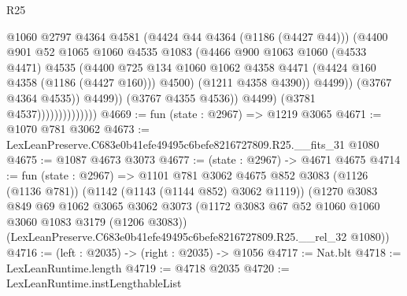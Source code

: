 \begin{lexlean}{R25}
\begin{coremodule}
                                          @1060
                                          @2797
                                          @4364
                                          @4581
                                          (@4424 @44 @4364 (@1186 (@4427 @44)))
                                          (@4400
                                            @901
                                            @52
                                            @1065
                                            @1060
                                            @4535
                                            @1083
                                            (@4466
                                              @900
                                              @1063
                                              @1060
                                              (@4533 @4471)
                                              @4535
                                              (@4400
                                                @725
                                                @134
                                                @1060
                                                @1062
                                                @4358
                                                @4471
                                                (@4424 @160 @4358 (@1186 (@4427 @160)))
                                                @4500)
                                              (@1211 @4358 @4390))
                                            @4499))
                                        (@3767 @4364 @4535))
                                      @4499))
                                  (@3767 @4355 @4536))
                                @4499)
                              (@3781 @4537))))))))))))))
@4669 := fun (state : @2967) => @1219 @3065
@4671 := @1070 @781 @3062
@4673 := LexLeanPreserve.C683e0b41efe49495c6befe8216727809.R25.__fits_31 @1080
@4675 := @1087 @4673 @3073
@4677 := (state : @2967) -> @4671 @4675
@4714 := fun (state : @2967) =>
  @1101
    @781
    @3062
    @4675
    @852
    @3083
    (@1126 (@1136 @781))
    (@1142 (@1143 (@1144 @852) @3062 @1119))
    (@1270
      @3083
      @849
      @69
      @1062
      @3065
      @3062
      @3073
      (@1172 @3083 @67 @52 @1060 @1060 @3060 @1083 @3179 (@1206 @3083))
      (LexLeanPreserve.C683e0b41efe49495c6befe8216727809.R25.__rel_32 @1080))
@4716 := (left : @2035) -> (right : @2035) -> @1056
@4717 := Nat.blt
@4718 := LexLeanRuntime.length
@4719 := @4718 @2035
@4720 := LexLeanRuntime.instLengthableList

\end{coremodule}
\end{lexlean}
